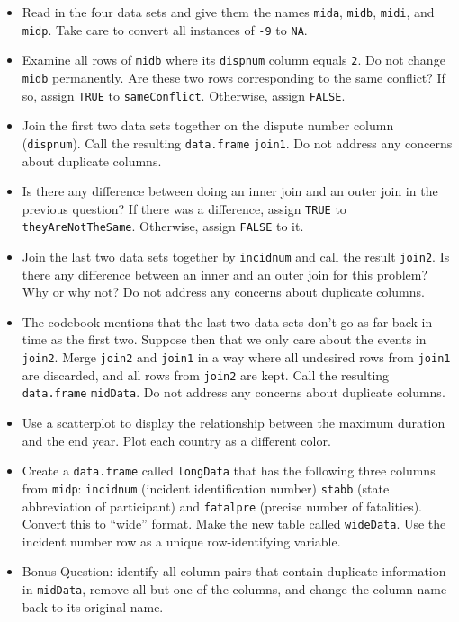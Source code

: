 \documentclass[
  12pt,
  krantz2]{krantz}
\providecommand{\tightlist}{%
  \setlength{\itemsep}{0pt}\setlength{\parskip}{0pt}}
\begin{document}
\begin{itemize}
\tightlist
\item
  Read in the four data sets and give them the names \texttt{mida}, \texttt{midb}, \texttt{midi}, and \texttt{midp}. Take care to convert all instances of \texttt{-9} to \texttt{NA}.
\item
  Examine all rows of \texttt{midb} where its \texttt{dispnum} column equals \texttt{2}. Do not change \texttt{midb} permanently. Are these two rows corresponding to the same conflict? If so, assign \texttt{TRUE} to \texttt{sameConflict}. Otherwise, assign \texttt{FALSE}.
\item
  Join the first two data sets together on the dispute number column (\texttt{dispnum}). Call the resulting \texttt{data.frame} \texttt{join1}. Do not address any concerns about duplicate columns.
\item
  Is there any difference between doing an inner join and an outer join in the previous question? If there was a difference, assign \texttt{TRUE} to \texttt{theyAreNotTheSame}. Otherwise, assign \texttt{FALSE} to it.
\item
  Join the last two data sets together by \texttt{incidnum} and call the result \texttt{join2}. Is there any difference between an inner and an outer join for this problem? Why or why not? Do not address any concerns about duplicate columns.
\item
  The codebook mentions that the last two data sets don't go as far back in time as the first two. Suppose then that we only care about the events in \texttt{join2}. Merge \texttt{join2} and \texttt{join1} in a way where all undesired rows from \texttt{join1} are discarded, and all rows from \texttt{join2} are kept. Call the resulting \texttt{data.frame} \texttt{midData}. Do not address any concerns about duplicate columns.
\item
  Use a scatterplot to display the relationship between the maximum duration and the end year. Plot each country as a different color.
\item
  Create a \texttt{data.frame} called \texttt{longData} that has the following three columns from \texttt{midp}: \texttt{incidnum} (incident identification number) \texttt{stabb} (state abbreviation of participant) and \texttt{fatalpre} (precise number of fatalities). Convert this to ``wide'' format. Make the new table called \texttt{wideData}. Use the incident number row as a unique row-identifying variable.
\item
  Bonus Question: identify all column pairs that contain duplicate information in \texttt{midData}, remove all but one of the columns, and change the column name back to its original name.
\end{itemize}
\end{document}
